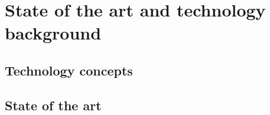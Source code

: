 
\chapter{State of the art and technology background}

\section{Technology concepts}

\section{State of the art}
